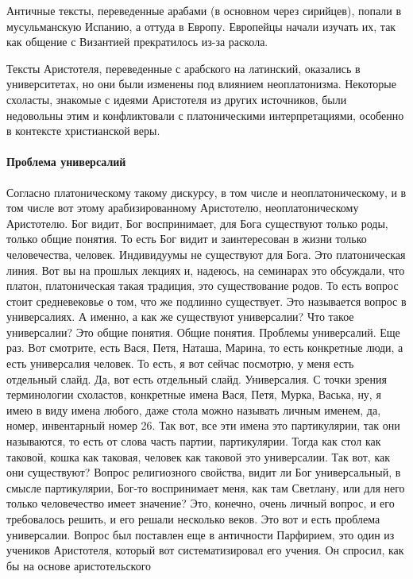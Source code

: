 Античные тексты, переведенные арабами (в основном через сирийцев), попали в мусульманскую Испанию, а оттуда в Европу. Европейцы начали изучать их, так как общение с Византией прекратилось из-за раскола. 

Тексты Аристотеля, переведенные с арабского на латинский, оказались в университетах, но они были изменены под влиянием неоплатонизма. Некоторые схоласты, знакомые с идеями Аристотеля из других источников, были недовольны этим и конфликтовали с платоническими интерпретациями, особенно в контексте христианской веры.

\paragraph{Проблема универсалий}

Согласно платоническому такому дискурсу, в том числе и
неоплатоническому, и в том числе вот этому арабизированному Аристотелю,
неоплатоническому Аристотелю. Бог видит, Бог воспринимает, для Бога существуют
только роды, только общие понятия. То есть Бог видит и заинтересован в жизни
только человечества, человек. Индивидуумы не существуют для Бога. Это
платоническая линия. Вот вы на прошлых лекциях и, надеюсь, на семинарах это
обсуждали, что платон, платоническая такая традиция, это существование родов. То
есть вопрос стоит средневековье о том, что же подлинно существует. Это
называется вопрос в универсалиях. А именно, а как же существуют универсалии? Что
такое универсалии? Это общие понятия. Общие понятия. Проблемы универсалий. Еще
раз. Вот смотрите, есть Вася, Петя, Наташа, Марина, то есть конкретные люди, а
есть универсалия человек. То есть, я вот сейчас посмотрю, у меня есть отдельный
слайд. Да, вот есть отдельный слайд. Универсалия. С точки зрения терминологии
схоластов, конкретные имена Вася, Петя, Мурка, Васька, ну, я имею в виду имена
любого, даже стола можно называть личным именем, да, номер, инвентарный номер
26. Так вот, все эти имена это партикулярии, так они называются, то есть от
слова часть партии, партикулярии. Тогда как стол как таковой, кошка как таковая,
человек как таковой это универсалии. Так вот, как они существуют? Вопрос
религиозного свойства, видит ли Бог универсальный, в смысле партикулярии, Бог-то
воспринимает меня, как там Светлану, или для него только человечество имеет
значение? Это, конечно, очень личный вопрос, и его требовалось решить, и его
решали несколько веков. Это вот и есть проблема универсалии. Вопрос был
поставлен еще в античности Парфирием, это один из учеников Аристотеля, который
вот систематизировал его учения. Он спросил, как бы на основе аристотельского
